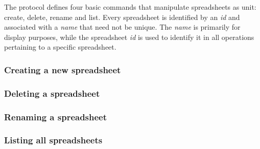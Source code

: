 The protocol defines four basic commands that manipulate spreadsheets as unit:
create, delete, rename and list. Every spreadsheet is identified by an \emph{id} 
and associated with a \emph{name} that need not be unique. The \emph{name} is 
primarily for display purposes, while the spreadsheet \emph{id} is used to identify 
it in all operations pertaining to a specific spreadsheet.

\subsubsection{Creating a new spreadsheet}


\subsubsection{Deleting a spreadsheet}


\subsubsection{Renaming a spreadsheet}


\subsubsection{Listing all spreadsheets}

